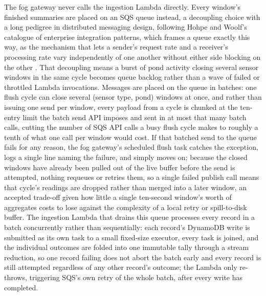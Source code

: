 \documentclass[conference]{IEEEtran}
\begin{document}
The fog gateway never calls the ingestion Lambda directly. Every window's finished summaries are placed on an SQS queue instead, a decoupling choice with a long pedigree in distributed messaging design, following Hohpe and Woolf's catalogue of enterprise integration patterns, which frames a queue exactly this way, as the mechanism that lets a sender's request rate and a receiver's processing rate vary independently of one another without either side blocking on the other \cite{ref10}. That decoupling means a burst of pond activity closing several sensor windows in the same cycle becomes queue backlog rather than a wave of failed or throttled Lambda invocations. Messages are placed on the queue in batches: one flush cycle can close several (sensor type, pond) windows at once, and rather than issuing one send per window, every payload from a cycle is chunked at the ten-entry limit the batch send API imposes and sent in at most that many batch calls, cutting the number of SQS API calls a busy flush cycle makes to roughly a tenth of what one call per window would cost. If that batched send to the queue fails for any reason, the fog gateway's scheduled flush task catches the exception, logs a single line naming the failure, and simply moves on; because the closed windows have already been pulled out of the live buffer before the send is attempted, nothing requeues or retries them, so a single failed publish call means that cycle's readings are dropped rather than merged into a later window, an accepted trade-off given how little a single ten-second window's worth of aggregates costs to lose against the complexity of a local retry or spill-to-disk buffer. The ingestion Lambda that drains this queue processes every record in a batch concurrently rather than sequentially: each record's DynamoDB write is submitted as its own task to a small fixed-size executor, every task is joined, and the individual outcomes are folded into one immutable tally through a stream reduction, so one record failing does not abort the batch early and every record is still attempted regardless of any other record's outcome; the Lambda only re-throws, triggering SQS's own retry of the whole batch, after every write has completed.
\end{document}
